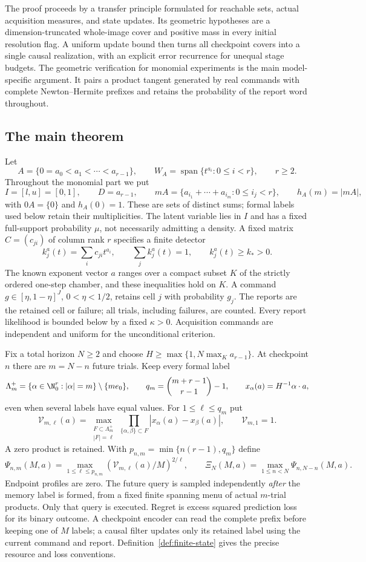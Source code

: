 \documentclass[11pt]{amsart}
\theoremstyle{definition}\newtheorem{definition}[theorem]{Definition}
\theoremstyle{remark}\newtheorem{remark}[theorem]{Remark}
\begin{document}
The proof proceeds by a transfer principle formulated for reachable
sets, actual acquisition measures, and state updates. Its geometric
hypotheses are a dimension-truncated whole-image cover and positive
mass in every initial resolution flag. A uniform update bound then
turns all checkpoint covers into a single causal realization, with an
explicit error recurrence for unequal stage budgets. The geometric
verification for monomial experiments is the main model-specific
argument. It pairs a product tangent generated by real commands with
complete Newton--Hermite prefixes and retains the probability of the
report word throughout.

\subsection{The main theorem}
Let
\[
 A=\{0=a_0<a_1<\cdots<a_{r-1}\},\qquad
 W_A=\operatorname{span}\{t^{a_i}:0\le i<r\},\qquad r\ge2.
\]
Throughout the monomial part we put
\[
 I=[l,u]=[0,1],\qquad D=a_{r-1},\qquad
 mA=\{a_{i_1}+\cdots+a_{i_m}:0\le i_j<r\},\qquad h_A(m)=|mA|,
\]
with $0A=\{0\}$ and $h_A(0)=1$. These are sets of distinct sums;
formal labels used below retain their multiplicities.
The latent variable lies in $I$ and has a fixed full-support
probability $\mu$, not necessarily admitting a density. A fixed matrix
$C=(c_{ji})$ of column rank $r$ specifies a finite detector
\[
 k_j^a(t)=\sum_i c_{ji}t^{a_i},\qquad
 \sum_j k_j^a(t)=1,\qquad k_j^a(t)\ge k_*>0.
\]
The known exponent vector $a$ ranges over a compact subset $K$ of the
strictly ordered one-step chamber, and these inequalities hold on $K$.
A command $g\in[\eta,1-\eta]^J$, $0<\eta<1/2$, retains cell $j$
with probability $g_j$. The reports are the retained cell or failure;
all trials, including failures, are counted. Every report likelihood is
bounded below by a fixed $\kappa>0$. Acquisition commands are independent
and uniform for the unconditional criterion.

Fix a total horizon $N\ge2$ and choose
$H\ge\max\{1,N\max_K a_{r-1}\}$. At checkpoint $n$ there are
$m=N-n$ future trials. Keep every formal label
\[
 \Lambda_m^+=\{\alpha\in\N_0^r:|\alpha|=m\}\setminus\{me_0\},
 \qquad q_m=\binom{m+r-1}{r-1}-1,
 \qquad x_\alpha(a)=H^{-1}\alpha\cdot a,
\]
even when several labels have equal values. For $1\le\ell\le q_m$ put
\[
 \mathcal V_{m,\ell}(a)=\max_{\substack{F\subset\Lambda_m^+\\|F|=\ell}}
     \prod_{\{\alpha,\beta\}\subset F}|x_\alpha(a)-x_\beta(a)|,
 \qquad \mathcal V_{m,1}=1.
\]
A zero product is retained. With $p_{n,m}=\min\{n(r-1),q_m\}$ define
\[
 \Psi_{n,m}(M,a)=\max_{1\le\ell\le p_{n,m}}
       (\mathcal V_{m,\ell}(a)/M)^{2/\ell},\qquad
 \Xi_N(M,a)=\max_{1\le n<N}\Psi_{n,N-n}(M,a).
\]
Endpoint profiles are zero. The future query is sampled independently
\emph{after} the memory label is formed, from a fixed finite spanning
menu of actual $m$-trial products. Only that query is executed. Regret
is excess squared prediction loss for its binary outcome. A checkpoint
encoder can read the complete prefix before keeping one of $M$ labels;
a causal filter updates only its retained label using the current
command and report. Definition~\ref{def:finite-state} gives the precise
resource and loss conventions.
\end{document}
